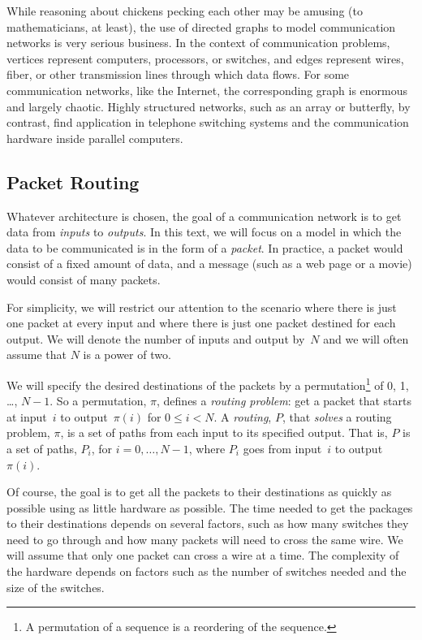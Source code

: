 While reasoning about chickens pecking each other may be amusing (to
mathematicians, at least), the use of directed graphs to model
communication networks is very serious business.  In the context of
communication problems, vertices represent computers, processors, or
switches, and edges represent wires, fiber, or other transmission
lines through which data flows.  For some communication networks, like
the Internet, the corresponding graph is enormous and largely chaotic.
Highly structured networks, such as an array or butterfly, by
contrast, find application in telephone switching systems and the
communication hardware inside parallel computers.

\subsection{Packet Routing}

Whatever architecture is chosen, the goal of a communication network
is to get data from \emph{inputs} to \emph{outputs}.  In this text, we
will focus on a model in which the data to be communicated is in the
form of a \emph{packet}.  In practice, a packet would consist of a
fixed amount of data, and a message (such as a web page or a movie)
would consist of many packets.

For simplicity, we will restrict our attention to the scenario where
there is just one packet at every input and where there is just one
packet destined for each output.  We will denote the number of inputs
and output by~$N$ and we will often assume that $N$ is a power of two.

We will specify the desired destinations of the packets by a
permutation\footnote{A permutation of a sequence is a reordering of
  the sequence.} of 0, 1, \dots, $N - 1$.  So a permutation, $\pi$,
defines a \emph{routing problem}: get a packet that starts at
input~$i$ to output~$\pi(i)$ for $0 \le i < N$.  A \emph{routing},
$P$, that \emph{solves} a routing problem, $\pi$, is a set of paths
from each input to its specified output.  That is, $P$ is a set of
paths, $P_i$, for $i = 0, \dots, N - 1$, where $P_i$ goes from
input~$i$ to output~$\pi(i)$.

Of course, the goal is to get all the packets to their destinations as
quickly as possible using as little hardware as possible.  The time
needed to get the packages to their destinations depends on several
factors, such as how many switches they need to go through and how
many packets will need to cross the same wire.  We will assume that
only one packet can cross a wire at a time.  The complexity of the
hardware depends on factors such as the number of switches needed and
the size of the switches.

